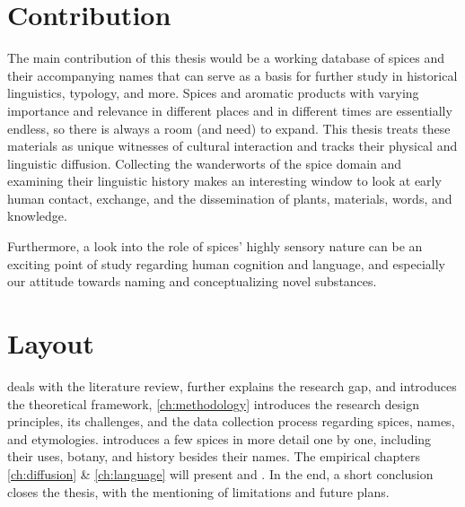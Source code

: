 


\section{Contribution}

The main contribution of this thesis would be a working database of spices and their accompanying names that can serve as a basis for further study in historical linguistics, typology, and more. Spices and aromatic products with varying importance and relevance in different places and in different times are essentially endless, so there is always a room (and need) to expand. This thesis treats these materials as unique witnesses of cultural interaction and tracks their physical and linguistic diffusion. Collecting the \glspl{wanderwort} of the spice domain and examining their linguistic history makes an interesting window to look at early human contact, exchange, and the dissemination of plants, materials, words, and knowledge.

Furthermore, a look into the role of spices' highly sensory nature can be an exciting point of study regarding human cognition and language, and especially our attitude towards naming and conceptualizing novel substances.





\section{Layout}

  deals with the literature review, further explains the research gap, and introduces the theoretical framework, \cref{ch:methodology}  introduces the research design principles, its challenges, and the data collection process regarding spices, names, and etymologies.   introduces a few spices in more detail one by one, including their uses, botany, and history besides their names. The empirical chapters \cref{ch:diffusion} \& \cref{ch:language} will present  and . In the end, a short conclusion closes the thesis, with the mentioning of limitations and future plans.











